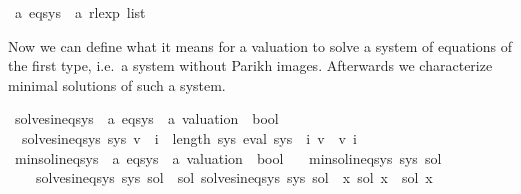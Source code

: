 \begin{isabellebody}
\isamarkupfalse%
\ {\isacharprime}{\kern0pt}a\ eq{\isacharunderscore}{\kern0pt}sys\ {\isacharequal}{\kern0pt}\ {\isachardoublequoteopen}{\isacharprime}{\kern0pt}a\ rlexp\ list{\isachardoublequoteclose}%
\begin{isamarkuptext}%
Now we can define what it means for a valuation  to solve a system of equations of the
first type, i.e.\ a system without Parikh images. Afterwards we characterize minimal solutions of
such a system.%
\end{isamarkuptext}\isamarkuptrue%
\isamarkupfalse%
\ solves{\isacharunderscore}{\kern0pt}ineq{\isacharunderscore}{\kern0pt}sys\ {\isacharcolon}{\kern0pt}{\isacharcolon}{\kern0pt}\ {\isachardoublequoteopen}{\isacharprime}{\kern0pt}a\ eq{\isacharunderscore}{\kern0pt}sys\ {\isasymRightarrow}\ {\isacharprime}{\kern0pt}a\ valuation\ {\isasymRightarrow}\ bool{\isachardoublequoteclose}\ \isanewline
\ \ {\isachardoublequoteopen}solves{\isacharunderscore}{\kern0pt}ineq{\isacharunderscore}{\kern0pt}sys\ sys\ v\ {\isasymequiv}\ {\isasymforall}i\ {\isacharless}{\kern0pt}\ length\ sys{\isachardot}{\kern0pt}\ eval\ {\isacharparenleft}{\kern0pt}sys\ {\isacharbang}{\kern0pt}\ i{\isacharparenright}{\kern0pt}\ v\ {\isasymsubseteq}\ v\ i{\isachardoublequoteclose}\isanewline
\isanewline
{}\isamarkupfalse%
\ min{\isacharunderscore}{\kern0pt}sol{\isacharunderscore}{\kern0pt}ineq{\isacharunderscore}{\kern0pt}sys\ {\isacharcolon}{\kern0pt}{\isacharcolon}{\kern0pt}\ {\isachardoublequoteopen}{\isacharprime}{\kern0pt}a\ eq{\isacharunderscore}{\kern0pt}sys\ {\isasymRightarrow}\ {\isacharprime}{\kern0pt}a\ valuation\ {\isasymRightarrow}\ bool{\isachardoublequoteclose}\ \isanewline
\ \ {\isachardoublequoteopen}min{\isacharunderscore}{\kern0pt}sol{\isacharunderscore}{\kern0pt}ineq{\isacharunderscore}{\kern0pt}sys\ sys\ sol\ {\isasymequiv}\isanewline
\ \ \ \ solves{\isacharunderscore}{\kern0pt}ineq{\isacharunderscore}{\kern0pt}sys\ sys\ sol\ {\isasymand}\ {\isacharparenleft}{\kern0pt}{\isasymforall}sol{\isacharprime}{\kern0pt}{\isachardot}{\kern0pt}\ solves{\isacharunderscore}{\kern0pt}ineq{\isacharunderscore}{\kern0pt}sys\ sys\ sol{\isacharprime}{\kern0pt}\ {\isasymlongrightarrow}\ {\isacharparenleft}{\kern0pt}{\isasymforall}x{\isachardot}{\kern0pt}\ sol\ x\ {\isasymsubseteq}\ sol{\isacharprime}{\kern0pt}\ x{\isacharparenright}{\kern0pt}{\isacharparenright}{\kern0pt}{\isachardoublequoteclose}%
\begin{isamarkuptext}%

\end{isamarkuptext}
\end{isabellebody}
